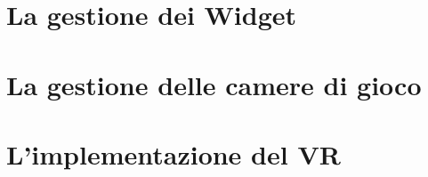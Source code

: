 \section{La gestione dei Widget}

\section{La gestione delle camere di gioco}

\section{L'implementazione del VR}